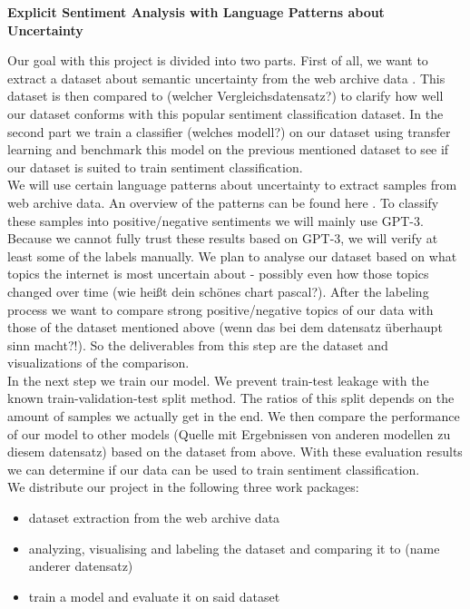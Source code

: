 \documentclass[a4paper,12pt,numbers=enddot]{scrartcl}
\begin{document}
\singlespacing

\begin{Large}
\begin{center}
\textbf{Explicit Sentiment Analysis with Language Patterns about Uncertainty}
\end{center}
\end{Large}

Our goal with this project is divided into two parts. First of all, we want to extract a dataset about semantic uncertainty from the web archive data \citep{Kiesel2018}. This dataset is then compared to (welcher Vergleichsdatensatz?) to clarify how well our dataset conforms with this popular sentiment classification dataset. In the second part we train a classifier (welches modell?) on our dataset using transfer learning and benchmark this model on the previous mentioned dataset to see if our dataset is suited to train sentiment classification. 
\\

We will use certain language patterns about uncertainty to extract samples from web archive data. An overview of the patterns can be found here \citep[p. 43]{vincze2014uncertainty}. To classify these samples into positive/negative sentiments we will mainly use GPT-3. Because we cannot fully trust these results based on GPT-3, we will verify at least some of the labels manually. We plan to analyse our dataset based on what topics the internet is most uncertain about - possibly even how those topics changed over time (wie heißt dein schönes chart pascal?). After the labeling process we want to compare strong positive/negative topics of our data with those of the dataset mentioned above (wenn das bei dem datensatz überhaupt sinn macht?!). So the deliverables from this step are the dataset and visualizations of the comparison.
\\

In the next step we train our model. We prevent train-test leakage with the known train-validation-test split method. The ratios of this split depends on the amount of samples we actually get in the end. We then compare the performance of our model to other models (Quelle mit Ergebnissen von anderen modellen zu diesem datensatz) based on the dataset from above. With these evaluation results we can determine if our data can be used to train sentiment classification.
\\

We distribute our project in the following three work packages:
\begin{itemize}
	\setlength\itemsep{-5pt}
	\item dataset extraction from the web archive data
	\item analyzing, visualising and labeling the dataset and comparing it to (name anderer datensatz)
	\item train a model and evaluate it on said dataset
\end{itemize}
\medskip
\end{document}

